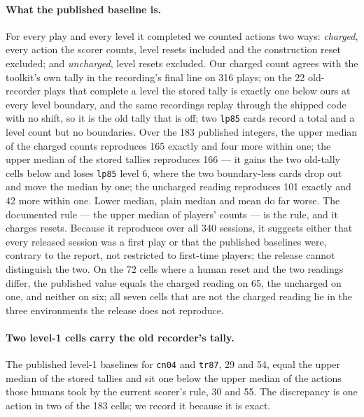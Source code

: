 \documentclass[11pt]{article}
\newcommand{\code}[1]{\texttt{#1}}
\begin{document}
\paragraph{What the published baseline is.} For every play and every level it
completed we counted actions two ways: \emph{charged}, every action the scorer
counts, level resets included and the construction reset excluded; and
\emph{uncharged}, level resets excluded. Our charged count agrees with the
toolkit's own tally in the recording's final line on 316 plays; on the 22
old-recorder plays that complete a level the stored tally is exactly one below
ours at every level boundary, and the same recordings replay through the
shipped code with no shift, so it is the old tally that is off; two
\code{lp85} cards record a total and a level count but no boundaries. Over the
183 published integers, the upper median of the charged counts reproduces 165
exactly and four more within one; the upper median of the stored tallies
reproduces 166 --- it gains the two old-tally cells below and loses
\code{lp85} level 6, where the two boundary-less cards drop out and move the
median by one; the uncharged reading reproduces 101 exactly and 42 more within one. Lower
median, plain median and mean do far worse. The documented rule --- the upper
median of players' counts --- is the rule, and it charges resets. Because it reproduces over all 340 sessions,
it suggests either that every released session was a first play or that the
published baselines were, contrary to the report, not restricted to
first-time players; the release cannot distinguish the two. On the 72
cells where a human reset and the two readings differ, the published value
equals the charged reading on 65, the uncharged on one, and neither on six;
all seven cells that are not the charged reading lie in the three
environments the release does not reproduce.

\paragraph{Two level-1 cells carry the old recorder's tally.} The published
level-1 baselines for \code{cn04} and \code{tr87}, 29 and 54, equal the upper
median of the stored tallies and sit one below the upper median of the actions
those humans took by the current scorer's rule, 30 and 55. The discrepancy is
one action in two of the 183 cells; we record it because it is exact.
\end{document}
